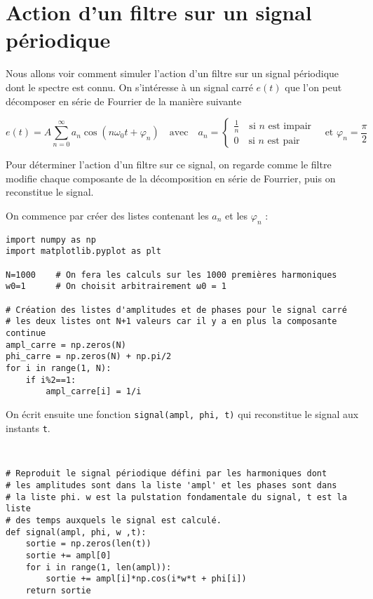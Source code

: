 \documentclass{cours}
\begin{document}
\section{Action d'un filtre sur un signal périodique}%
\label{sec:action_d_un_filtre_sur_un_signal_periodique}

Nous allons voir comment simuler l'action d'un filtre sur un signal périodique dont le spectre est connu. On s'intéresse à un signal carré $e(t)$ que l'on peut décomposer en série de Fourrier de la manière suivante

\begin{equation}
  e(t) = A\sum_{n=0}^\infty a_n\cos(n\omega_0t + \varphi_n) \quad \text{avec} \quad a_n = 
  \begin{cases}
    \frac{1}{n} \quad \text{si $n$ est impair} \\
    0 \quad \text{si $n$ est pair}
  \end{cases} \quad \text{et $\varphi_n = \frac{\pi}{2}$ }
\end{equation}

Pour déterminer l'action d'un filtre sur ce signal, on regarde comme le filtre modifie chaque composante de la décomposition en série de Fourrier, puis on reconstitue le signal. 

On commence par créer des listes contenant les $a_n$ et les $\varphi_n$ :
\begin{verbatim}
import numpy as np
import matplotlib.pyplot as plt

N=1000    # On fera les calculs sur les 1000 premières harmoniques
w0=1      # On choisit arbitrairement ω0 = 1

# Création des listes d'amplitudes et de phases pour le signal carré
# les deux listes ont N+1 valeurs car il y a en plus la composante continue
ampl_carre = np.zeros(N)
phi_carre = np.zeros(N) + np.pi/2
for i in range(1, N):
    if i%2==1:
        ampl_carre[i] = 1/i
\end{verbatim}

On écrit ensuite une fonction \texttt{signal(ampl, phi, t)} qui reconstitue le signal aux instants \texttt{t}.

\begin{verbatim}


# Reproduit le signal périodique défini par les harmoniques dont 
# les amplitudes sont dans la liste 'ampl' et les phases sont dans 
# la liste phi. w est la pulstation fondamentale du signal, t est la liste
# des temps auxquels le signal est calculé.
def signal(ampl, phi, w ,t):
    sortie = np.zeros(len(t))
    sortie += ampl[0]
    for i in range(1, len(ampl)):
        sortie += ampl[i]*np.cos(i*w*t + phi[i])
    return sortie
\end{verbatim}
\end{document}
